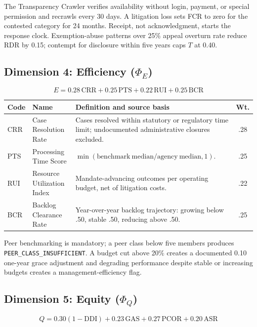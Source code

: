 The Transparency Crawler verifies availability without login, payment, or
special permission and recrawls every 30 days. A litigation loss sets FCR to
zero for the contested category for 24 months. Receipt, not acknowledgment,
starts the response clock. Exemption-abuse patterns over 25\% appeal overturn
rate reduce RDR by 0.15; contempt for disclosure within five years caps
\(T\) at 0.40.

\subsection{Dimension 4: Efficiency (\(\Phi_E\))}

\[
E = 0.28\,\mathrm{CRR}+0.25\,\mathrm{PTS}+0.22\,\mathrm{RUI}+0.25\,\mathrm{BCR}
\]

\begin{center}
\begin{tabular}{p{1.4cm}p{4cm}p{6.7cm}c}
\toprule
Code & Name & Definition and source basis & Wt. \\
\midrule
CRR & Case Resolution Rate & Cases resolved within statutory or regulatory time limit; undocumented administrative closures excluded. & .28 \\
PTS & Processing Time Score & \(\min(\mathrm{benchmark\ median}/\mathrm{agency\ median},1)\). & .25 \\
RUI & Resource Utilization Index & Mandate-advancing outcomes per operating budget, net of litigation costs. & .22 \\
BCR & Backlog Clearance Rate & Year-over-year backlog trajectory: growing below .50, stable .50, reducing above .50. & .25 \\
\bottomrule
\end{tabular}
\end{center}

Peer benchmarking is mandatory; a peer class below five members produces
\texttt{PEER\_CLASS\_INSUFFICIENT}. A budget cut above 20\% creates a documented
0.10 one-year grace adjustment and degrading performance despite stable or
increasing budgets creates a management-efficiency flag.

\subsection{Dimension 5: Equity (\(\Phi_Q\))}

\[
Q = 0.30(1-\mathrm{DDI})+0.23\,\mathrm{GAS}+0.27\,\mathrm{PCOR}+0.20\,\mathrm{ASR}
\]

